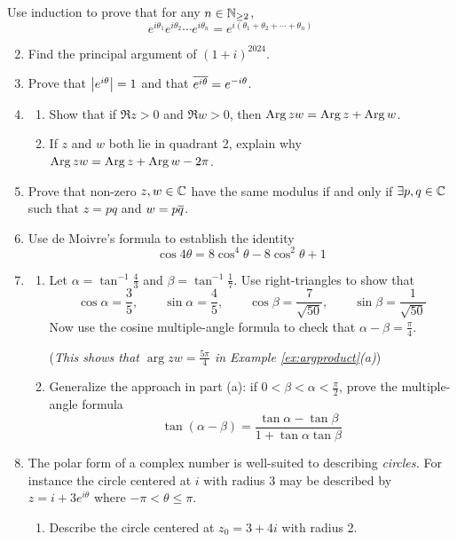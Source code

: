 \begin{exercises*}
	\exstart Use induction to prove that for any $n\in\mathbb{N}_{\ge 2}$,
	\[
		e^{i\theta_1}e^{i\theta_2}\cdots e^{i\theta_n}=e^{i(\theta_1+\theta_2+\cdots+\theta_n)}
	\]

	\begin{enumerate}\setcounter{enumi}{1}
		\item Find the principal argument of $(1+i)^{2024}$.
		
		\item Prove that $\left| e^{i\theta}\right|=1$ and that $\overline{e^{i\theta}}=e^{-i\theta}$.
	
		\item\begin{enumerate}
		  \item Show that if $\Re z>0$ and $\Re w>0$, then $\operatorname{Arg} zw=\operatorname{Arg} z+\operatorname{Arg} w$.
			\item If $z$ and $w$ both lie in quadrant 2, explain why $\operatorname{Arg} zw=\operatorname{Arg} z+\operatorname{Arg} w-2\pi$.
		\end{enumerate}
	
	 	\item Prove that non-zero $z,w\in\mathbb{C}$ have the same modulus if and only if $\exists p,q\in\mathbb{C}$ such that $z=pq$ and $w=p\overline{q}$.
		
	  \item\label{ex:deM} Use de Moivre's formula to establish the identity
	  \[
	  	\cos 4\theta=8\cos^4\!\theta-8\cos^2\!\theta+1
	  \]
	  
	  \item\label{ex:argproduct2}
	  \begin{enumerate}
	    \item Let $\alpha=\tan^{-1}\frac 43$ and $\beta=\tan^{-1}\frac 17$. Use right-triangles to show that
	  	\[
	  		\cos\alpha=\frac 35,\qquad\sin\alpha=\frac 45,\qquad\cos\beta=\frac 7{\sqrt{50}},\qquad\sin\beta=\frac 1{\sqrt{50}}
	  	\]
	  	Now use the cosine multiple-angle formula to check that $\alpha-\beta=\frac\pi 4$.\par
	  	(\emph{This shows that $\arg zw=\frac{5\pi}4$ in Example \ref{ex:argproduct}(a)})
	  	
	  	\item Generalize the approach in part (a): if $0<\beta<\alpha<\frac\pi 2$, prove the multiple-angle formula
	  	\[
	  		\tan(\alpha-\beta)=\frac{\tan\alpha-\tan\beta}{1+\tan\alpha\tan\beta}
	  	\]
	  \end{enumerate}
	  
	 
	  \item The polar form of a complex number is well-suited to describing \emph{circles.} For instance the circle centered at $i$ with radius 3 may be described by $z=i+3e^{i\theta}$ where $-\pi<\theta\le\pi$. 
	  \begin{enumerate}
	    \item Describe the circle centered at $z_0=3+4i$ with radius 2.
	    

\end{enumerate}
\end{enumerate}
\end{exercises*}

